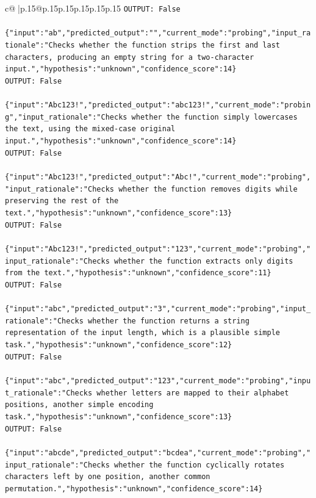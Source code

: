 \documentclass{article}
\begin{document}
{\begin{supertabular}{c@{$\;$}|p{.15\linewidth}@{}p{.15\linewidth}p{.15\linewidth}p{.15\linewidth}p{.15\linewidth}p{.15\linewidth}}
{{{\texttt{OUTPUT: False} \\
\\ 
\texttt{\{"input":"ab","predicted\_output":"","current\_mode":"probing","input\_rationale":"Checks whether the function strips the first and last characters, producing an empty string for a two{-}character input.","hypothesis":"unknown","confidence\_score":14\}} \\
\texttt{OUTPUT: False} \\
\\ 
\texttt{\{"input":"Abc123!","predicted\_output":"abc123!","current\_mode":"probing","input\_rationale":"Checks whether the function simply lowercases the text, using the mixed{-}case original input.","hypothesis":"unknown","confidence\_score":14\}} \\
\texttt{OUTPUT: False} \\
\\ 
\texttt{\{"input":"Abc123!","predicted\_output":"Abc!","current\_mode":"probing","input\_rationale":"Checks whether the function removes digits while preserving the rest of the text.","hypothesis":"unknown","confidence\_score":13\}} \\
\texttt{OUTPUT: False} \\
\\ 
\texttt{\{"input":"Abc123!","predicted\_output":"123","current\_mode":"probing","input\_rationale":"Checks whether the function extracts only digits from the text.","hypothesis":"unknown","confidence\_score":11\}} \\
\texttt{OUTPUT: False} \\
\\ 
\texttt{\{"input":"abc","predicted\_output":"3","current\_mode":"probing","input\_rationale":"Checks whether the function returns a string representation of the input length, which is a plausible simple task.","hypothesis":"unknown","confidence\_score":12\}} \\
\texttt{OUTPUT: False} \\
\\ 
\texttt{\{"input":"abc","predicted\_output":"123","current\_mode":"probing","input\_rationale":"Checks whether letters are mapped to their alphabet positions, another simple encoding task.","hypothesis":"unknown","confidence\_score":13\}} \\
\texttt{OUTPUT: False} \\
\\ 
\texttt{\{"input":"abcde","predicted\_output":"bcdea","current\_mode":"probing","input\_rationale":"Checks whether the function cyclically rotates characters left by one position, another common permutation.","hypothesis":"unknown","confidence\_score":14\}} \\
}}}
\end{supertabular}}
\end{document}

